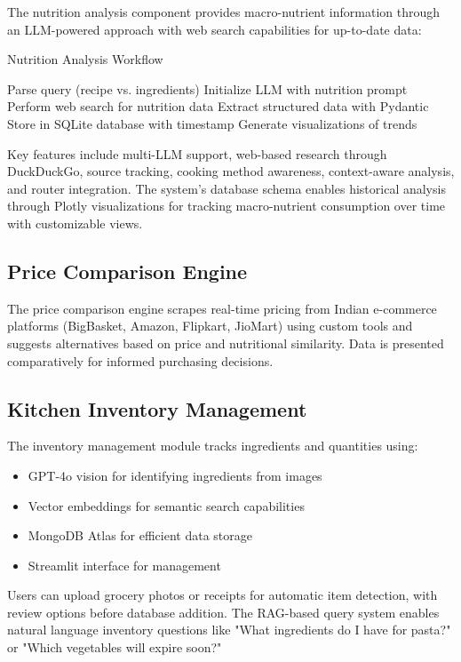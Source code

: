 \documentclass{ecai}
\begin{document}
The nutrition analysis component provides macro-nutrient information through an LLM-powered approach with web search capabilities for up-to-date data:

\begin{algorithm}
\caption{Nutrition Analysis Workflow}
\begin{algorithmic}[1]
\State Parse query (recipe vs. ingredients)
\State Initialize LLM with nutrition prompt
\State Perform web search for nutrition data
\State Extract structured data with Pydantic
\State Store in SQLite database with timestamp
\State Generate visualizations of trends
\end{algorithmic}
\end{algorithm}

Key features include multi-LLM support, web-based research through DuckDuckGo, source tracking, cooking method awareness, context-aware analysis, and router integration. The system's database schema enables historical analysis through Plotly visualizations for tracking macro-nutrient consumption over time with customizable views.

\subsection{Price Comparison Engine}

The price comparison engine scrapes real-time pricing from Indian e-commerce platforms (BigBasket, Amazon, Flipkart, JioMart) using custom tools and suggests alternatives based on price and nutritional similarity. Data is presented comparatively for informed purchasing decisions.

\subsection{Kitchen Inventory Management}

The inventory management module tracks ingredients and quantities using:
\begin{itemize}[noitemsep,topsep=0pt]
    \item GPT-4o vision for identifying ingredients from images
    \item Vector embeddings for semantic search capabilities
    \item MongoDB Atlas for efficient data storage
    \item Streamlit interface for management
\end{itemize}

Users can upload grocery photos or receipts for automatic item detection, with review options before database addition. The RAG-based query system enables natural language inventory questions like "What ingredients do I have for pasta?" or "Which vegetables will expire soon?"
\end{document}
